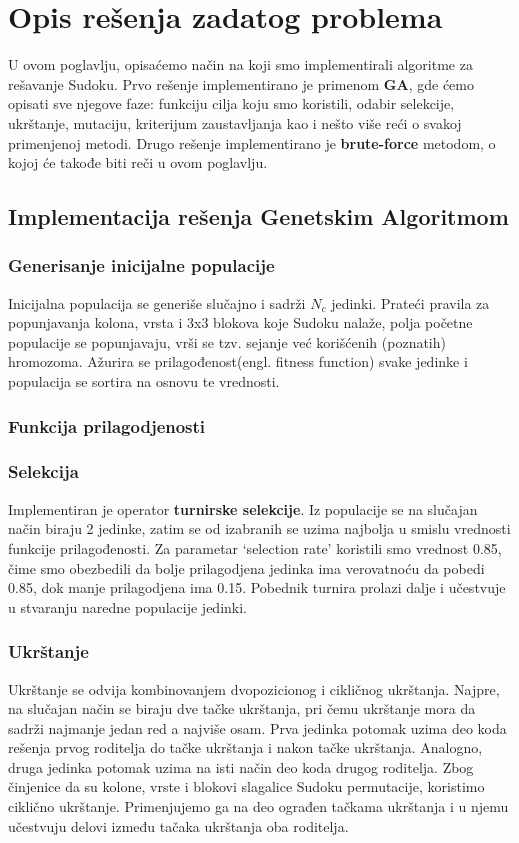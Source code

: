\documentclass[a4paper]{article}
\begin{document}
\section{Opis rešenja zadatog problema}
U ovom poglavlju, opisaćemo način na koji smo implementirali algoritme za rešavanje Sudoku. Prvo rešenje implementirano je primenom \textbf{GA}, gde ćemo opisati sve njegove faze: funkciju cilja koju smo koristili, odabir selekcije, ukrštanje, mutaciju, kriterijum zaustavljanja kao i nešto više reći o svakoj primenjenoj metodi. Drugo rešenje implementirano je \textbf{brute-force} metodom, o kojoj će takođe biti reči u ovom poglavlju.

\subsection{Implementacija rešenja Genetskim Algoritmom}
\subsubsection{Generisanje inicijalne populacije}
Inicijalna populacija se generiše slučajno i sadrži $N_c$ jedinki. Prateći pravila za popunjavanja kolona, vrsta i 3x3 blokova koje Sudoku nalaže, polja početne populacije se popunjavaju, vrši se tzv. sejanje već korišćenih (poznatih) hromozoma. Ažurira se prilagođenost(engl. fitness function) svake jedinke i populacija se sortira na osnovu te vrednosti.
\subsubsection{Funkcija prilagodjenosti}
\subsubsection{Selekcija}
Implementiran je operator \textbf{turnirske selekcije}. Iz populacije se na slučajan način biraju 2 jedinke, zatim se od izabranih se uzima najbolja u smislu vrednosti funkcije prilagođenosti. Za parametar ‘selection rate’ koristili smo vrednost 0.85, čime smo obezbedili da bolje prilagodjena jedinka ima verovatnoću da pobedi 0.85, dok manje prilagodjena ima 0.15.
Pobednik turnira prolazi dalje i učestvuje u stvaranju naredne populacije jedinki. 
\subsubsection{Ukrštanje}
Ukrštanje se odvija kombinovanjem dvopozicionog i cikličnog ukrštanja. Najpre, na slučajan način se biraju dve tačke ukrštanja, pri čemu ukrštanje mora da sadrži najmanje jedan red a najviše osam.
Prva jedinka potomak uzima deo koda rešenja prvog roditelja do tačke ukrštanja i nakon tačke ukrštanja. Analogno, druga jedinka potomak uzima na isti način deo koda drugog roditelja. Zbog činjenice da su kolone, vrste i blokovi slagalice Sudoku permutacije, koristimo ciklično ukrštanje. Primenjujemo ga na deo ograđen tačkama ukrštanja i u njemu učestvuju delovi između tačaka ukrštanja oba roditelja.
\end{document}
